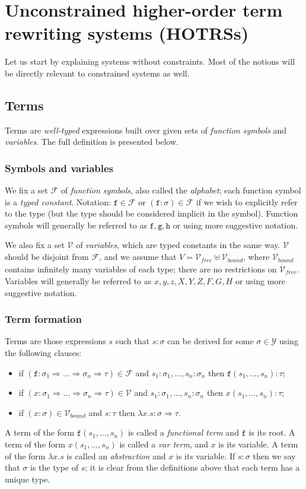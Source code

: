 \documentclass{lmcs}
\theoremstyle{theorem}\newtheorem{theorem}{Theorem}
\theoremstyle{theorem}\newtheorem{lemma}[theorem]{Lemma}
\theoremstyle{theorem}\newtheorem{corollary}[theorem]{Corollary}
\theoremstyle{definition}\newtheorem{definition}[theorem]{Definition}
\theoremstyle{definition}\newtheorem{example}[theorem]{Example}
\newcommand{\F}{\mathcal{F}}
\newcommand{\V}{\mathcal{V}}
\newcommand{\Vfree}{\mathcal{V}_{\mathit{free}}}
\newcommand{\Vbound}{\mathcal{V}_{\mathit{bound}}}
\newcommand{\Types}{\mathcal{Y}}
\newcommand{\atype}{\sigma}
\newcommand{\btype}{\tau}
\newcommand{\identifier}[1]{\mathtt{#1}}
\newcommand{\afun}{\identifier{f}}
\newcommand{\bfun}{\identifier{g}}
\newcommand{\cfun}{\identifier{h}}
\newcommand{\avar}{x}
\newcommand{\bvar}{y}
\newcommand{\cvar}{z}
\newcommand{\Avar}{X}
\newcommand{\Bvar}{Y}
\newcommand{\Cvar}{Z}
\newcommand{\AFvar}{F}
\newcommand{\BFvar}{G}
\newcommand{\CFvar}{H}
\newcommand{\abs}[2]{\lambda #1.#2}
\newcommand{\arrtype}{\Rightarrow}
\newcommand{\mysubsection}[1]{\vspace{-12pt}\subsubsection{#1}}
\begin{document}
\section{Unconstrained higher-order term rewriting systems (HOTRSs)}

Let us start by explaining systems without constraints. Most of the notions will be directly
relevant to constrained systems as well.

\subsection{Terms}
Terms are \emph{well-typed} expressions built over given sets of \emph{function symbols} and
\emph{variables}. The full definition is presented below.

\mysubsection{Symbols and variables}

We fix a set $\F$ of \emph{function symbols}, also called the \emph{alphabet}; each function symbol
is a \emph{typed constant}. Notation: $\afun \in \F$ or $(\afun : \atype) \in \F$ if we wish to
explicitly refer to the type (but the type should be considered implicit in the symbol).
Function symbols will generally be referred to as $\afun,\bfun,\cfun$ or using more suggestive
notation.

We also fix a set $\V$ of \emph{variables}, which are typed constants in the same way.  $\V$ should
be disjoint from $\F$, and we assume that $V = \Vfree \uplus \Vbound$, where $\Vbound$ contains
infinitely many variables of each type; there are no restrictions on $\Vfree$.
Variables will generally be referred to as $\avar,\bvar,\cvar,\Avar,\Bvar,\Cvar,\AFvar,\BFvar,
\CFvar$ or using more suggestive notation.

\mysubsection{Term formation}

Terms are those expressions $s$ such that $s : \atype$ can be derived for some $\atype \in \Types$
using the following clauses:
\begin{itemize}
\item if $(\afun : \atype_1 \arrtype \dots \arrtype \atype_n \arrtype \btype) \in \F$ and
  $s_1 : \atype_1,\dots,s_n : \atype_n$ then $\afun(s_1,\dots,s_n) : \btype$;
\item if $(\avar : \atype_1 \arrtype \dots \arrtype \atype_n \arrtype \btype) \in \V$ and
  $s_1 : \atype_1,\dots,s_n : \atype_n$ then $\avar(s_1,\dots,s_n) : \btype$;
\item if $(\avar : \atype) \in \Vbound$ and $s : \btype$ then $\abs{\avar}{s} : \atype \arrtype
  \btype$.
\end{itemize}
A term of the form $\afun(s_1,\dots,s_n)$ is called a \emph{functional term} and $\afun$ is its
root.
A term of the form $\avar(s_1,\dots,s_n)$ is called a \emph{var term}, and $\avar$ is its variable.
A term of the form $\abs{\avar}{s}$ is called an \emph{abstraction} and $\avar$ is its variable.
If $s : \atype$ then we say that $\atype$ is the type of $s$; it is clear from the definitions
above that each term has a unique type.
\end{document}

